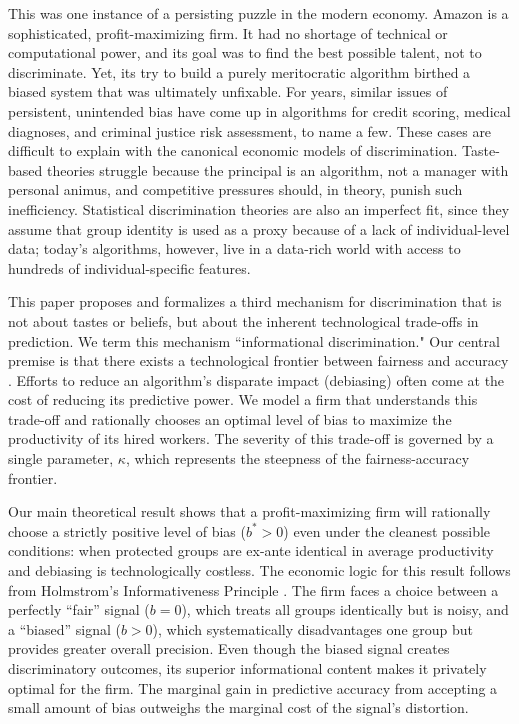 \documentclass[12pt,a4paper]{article}
\theoremstyle{definition}
\theoremstyle{remark}
\begin{document}
This was one instance of a persisting puzzle in the modern economy. Amazon is a sophisticated, profit-maximizing firm. It had no shortage of technical or computational power, and its goal was to find the best possible talent, not to discriminate. Yet, its try to build a purely meritocratic algorithm birthed a biased system that was ultimately unfixable. For years, similar issues of persistent, unintended bias have come up in algorithms for credit scoring, medical diagnoses, and criminal justice risk assessment, to name a few. These cases are difficult to explain with the canonical economic models of discrimination. Taste-based theories \citep{Becker1957} struggle because the principal is an algorithm, not a manager with personal animus, and competitive pressures should, in theory, punish such inefficiency. Statistical discrimination theories \citep{Phelps1972, Arrow1973} are also an imperfect fit, since they assume that group identity is used as a proxy because of a lack of individual-level data; today's algorithms, however, live in a data-rich world with access to hundreds of individual-specific features.

This paper proposes and formalizes a third mechanism for discrimination that is not about tastes or beliefs, but about the inherent technological trade-offs in prediction. We term this mechanism ``informational discrimination." Our central premise is that there exists a technological frontier between fairness and accuracy \citep{Kleinberg2017, Chouldechova2017}. Efforts to reduce an algorithm's disparate impact (debiasing) often come at the cost of reducing its predictive power. We model a firm that understands this trade-off and rationally chooses an optimal level of bias to maximize the productivity of its hired workers. The severity of this trade-off is governed by a single parameter, $\kappa$, which represents the steepness of the fairness-accuracy frontier.

Our main theoretical result shows that a profit-maximizing firm will rationally choose a strictly positive level of bias ($b^* > 0$) even under the cleanest possible conditions: when protected groups are ex-ante identical in average productivity and debiasing is technologically costless. The economic logic for this result follows from Holmstrom's Informativeness Principle \citep{Holmstrom1979} . The firm faces a choice between a perfectly ``fair'' signal ($b=0$), which treats all groups identically but is noisy, and a ``biased'' signal ($b>0$), which systematically disadvantages one group but provides greater overall precision. Even though the biased signal creates discriminatory outcomes, its superior informational content makes it privately optimal for the firm. The marginal gain in predictive accuracy from accepting a small amount of bias outweighs the marginal cost of the signal's distortion.
\end{document}
